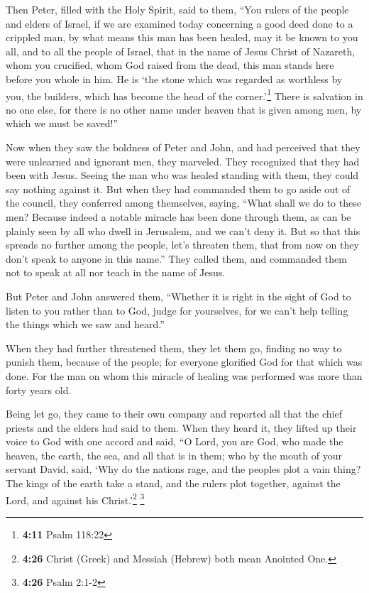  Then Peter, filled with the Holy Spirit, said to them,
``You rulers of the people and elders of Israel,  if we
are examined today concerning a good deed done to a crippled man, by
what means this man has been healed,  may it be known to
you all, and to all the people of Israel, that in the name of Jesus
Christ of Nazareth, whom you crucified, whom God raised from the dead,
this man stands here before you whole in him.  He is `the
stone which was regarded as worthless by you, the builders, which has
become the head of the corner.'\footnote{\textbf{4:11} Psalm 118:22}
 There is salvation in no one else, for there is no other
name under heaven that is given among men, by which we must be saved!''

 Now when they saw the boldness of Peter and John, and
had perceived that they were unlearned and ignorant men, they marveled.
They recognized that they had been with Jesus.  Seeing
the man who was healed standing with them, they could say nothing
against it.  But when they had commanded them to go aside
out of the council, they conferred among themselves, 
saying, ``What shall we do to these men? Because indeed a notable
miracle has been done through them, as can be plainly seen by all who
dwell in Jerusalem, and we can't deny it.  But so that
this spreads no further among the people, let's threaten them, that from
now on they don't speak to anyone in this name.''  They
called them, and commanded them not to speak at all nor teach in the
name of Jesus.

 But Peter and John answered them, ``Whether it is right
in the sight of God to listen to you rather than to God, judge for
yourselves,  for we can't help telling the things which
we saw and heard.''

 When they had further threatened them, they let them go,
finding no way to punish them, because of the people; for everyone
glorified God for that which was done.  For the man on
whom this miracle of healing was performed was more than forty years
old.

 Being let go, they came to their own company and
reported all that the chief priests and the elders had said to them.
 When they heard it, they lifted up their voice to God
with one accord and said, ``O Lord, you are God, who made the heaven,
the earth, the sea, and all that is in them;  who by the
mouth of your servant David, said, `Why do the nations rage, and the
peoples plot a vain thing?  The kings of the earth take a
stand, and the rulers plot together, against the Lord, and against his
Christ.'\footnote{\textbf{4:26} Christ (Greek) and Messiah (Hebrew) both
  mean Anointed One.} \footnote{\textbf{4:26} Psalm 2:1-2}

